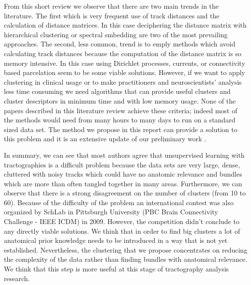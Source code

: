 \documentclass[preprint,authoryear,a4paper,10pt,onecolumn]{elsarticle}
\begin{document}


From this short review we observe that there are two main trends in the
literature. The first which is very frequent use of track distances and
the calculation of distance matrices. In this case deciphering the
distance matrix with hierarchical clustering or spectral smbedding are
two of the most prevailing approaches. The second, less common, trend is
to emply methods which avoid calculating track distances because the
computation of the distance matrix is so memory intensive. In this case
using Dirichlet processes, currents, or connectivity based parcelation
seem to be some viable solutions. However, if we want to apply
clustering in clinical usage or to make practitioners and
neuroscientists' analysis less time consuming we need algorithms that
can provide useful clusters and cluster descriptors in minimum time and
with low memory usage. None of the papers described in this literature
review achieve these criteria; indeed most of the methods would need
from many hours to many days to run on a standard sized data set. The
method we propose in this report can provide a solution to this
problem and it is an extensive update of our preliminary work \citet{EGMB10}.

In summary, we can see that most authors agree that unsupervised
learning with tractographies is a difficult problem because the data
sets are very large, dense, cluttered with noisy tracks which could have
no anatomic relevance and bundles which are more than often tangled
together in many areas. Furthermore, we can observe that there is a
strong disagreement on the number of clusters (from 10 to 60). Because of the
difficulty of the problem an international contest was also organized by
SchLab in Pittsburgh University (PBC Brain Connectivity Challenge - IEEE
ICDM) in 2009. However, the competition didn't conclude to any directly
viable solutions. We think that in order to find big clusters
a lot of anatomical prior knowledge needs to be introduced in a way that
is not yet established. Nevertheless, the clustering that we propose
concentrates on reducing the complexity of the data rather than finding
bundles with anatomical relevance. We think that this step is more
useful at this stage of tractography analysis research.
\end{document}
